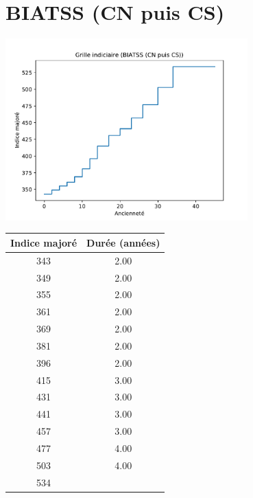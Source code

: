 \newpage 
 
\chapter{BIATSS (CN puis CS)} 

\begin{minipage}{0.55\linewidth}\includegraphics[width=0.7\textwidth]{fig/grille_BIATSS.pdf}\end{minipage} 
\begin{minipage}{0.3\linewidth} 
 \begin{center} 

\begin{tabular}[htb]{|c|c|} 
\hline 
 Indice majoré &  Durée (années) \\ 
\hline \hline 
 343 &  2.00 \\ 
\hline 
 349 &  2.00 \\ 
\hline 
 355 &  2.00 \\ 
\hline 
 361 &  2.00 \\ 
\hline 
 369 &  2.00 \\ 
\hline 
 381 &  2.00 \\ 
\hline 
 396 &  2.00 \\ 
\hline 
 415 &  3.00 \\ 
\hline 
 431 &  3.00 \\ 
\hline 
 441 &  3.00 \\ 
\hline 
 457 &  3.00 \\ 
\hline 
 477 &  4.00 \\ 
\hline 
 503 &  4.00 \\ 
\hline 
 534 &   \\ 
\hline 
\hline 
\end{tabular} 
\end{center} 
 \end{minipage} 


